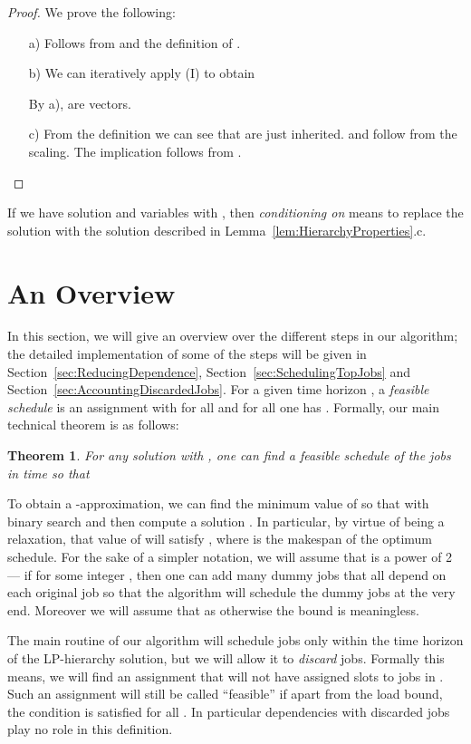 \documentclass[11pt,letterpaper,oneside,english]{article}
\theoremstyle{theorem}
\newtheorem{theorem}{Theorem}
\begin{document}
\begin{proof}
We prove the following:
\begin{enumerate}
\item[a)] Follows from  and the definition of .
\item[b)] We can iteratively apply (I) to obtain 
 
By a),
 are  vectors.
\item[c)] From the definition we can see that  are just
inherited.  and 
follow from the scaling. The implication 
follows from .
\end{enumerate}
\end{proof}
If we have solution 
and variables  with , then \emph{conditioning on } means to replace the solution  with the solution 
 described in Lemma~\ref{lem:HierarchyProperties}.c.






\section{An Overview}\label{sec:Overview}

In this section, we will give an overview over the different steps in our algorithm; the detailed 
implementation of some of the steps will be given in Section~\ref{sec:ReducingDependence}, Section~\ref{sec:SchedulingTopJobs} and Section~\ref{sec:AccountingDiscardedJobs}. 
For a given time horizon , a \emph{feasible schedule} is an assignment 
with  for all  and for all  one has .
Formally, our main technical theorem is as follows: \begin{theorem} \label{thm:MainTechnicalTheorem}
For any solution  with 
,
one can find a feasible schedule  of the jobs in 
time  so that 

\end{theorem}
To obtain a -approximation, we can find the minimum value of  so that  
with binary search and then compute a solution 
. In particular, by virtue of being a relaxation, that value of  will satisfy , where 
 is the makespan of the optimum schedule. For the sake of a simpler notation, we will assume that 
is a power of 2 --- if  for some integer , then one can add  many dummy
jobs that all depend on each original job so that the algorithm will schedule the dummy jobs  at the
very end. Moreover we will assume that  as otherwise the bound is meaningless.


The main routine of our algorithm will schedule jobs only within the time horizon  of the LP-hierarchy solution, but we will allow it to \emph{discard} jobs. Formally this
means, we will find an assignment  that will not have assigned slots to jobs 
in . Such an assignment will still be called ``feasible'' if apart from the load bound, 
the condition  is satisfied for all . 
In particular dependencies with discarded jobs play no role in this definition. 
\end{document}
